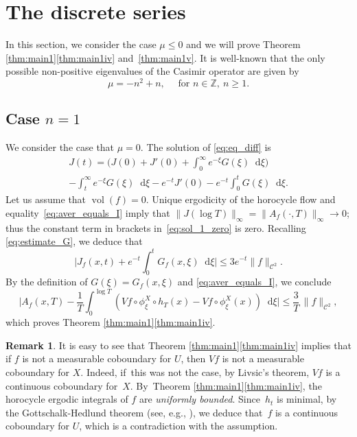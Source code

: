 \documentclass[11pt]{article}
\newcommand \Z{\mathbb{Z}}
\newcommand*{\diff}{\mathop{}\!\mathrm{d}}
\newcommand{\aver}[1]{A_{#1}(x,T)}
\DeclareMathOperator{\vol}{vol}
\theoremstyle{definition}
\newtheorem{remark}[theorem]{Remark}
\begin{document}
\section{The discrete series}\label{section:discrete_ser}

In this section, we consider the case $\mu \leq 0$ and we will prove Theorem \ref{thm:main1}\eqref{thm:main1iv} and~\eqref{thm:main1v}. It is well-known \cite{Bar} that the only possible non-positive eigenvalues of the Casimir operator are given by
\[
\mu = -n^2+n, \quad \text{ for }n \in \Z,\ n \geq 1.
\]

\subsection{Case $n=1$}
We consider the case that $\mu = 0$. The solution of \eqref{eq:eq_diff} is
\begin{multline}\label{eq:sol_1_zero}
J(t) = \biggl(J(0) + J'(0) + \int_0^\infty e^{-\xi}G(\xi) \diff \xi \biggr)\\
- \int_t^\infty e^{-\xi}G(\xi) \diff \xi - e^{-t} J'(0) - e^{-t}\int_0^t G(\xi) \diff \xi.
\end{multline}
Let us assume that $\vol(f)=0$. Unique ergodicity of the horocycle flow and equality~\eqref{eq:aver_equals_I} imply that $\|J(\log T) \|_\infty = \|A_f(\cdot, T) \|_\infty \to 0$; thus the constant term in brackets in~\eqref{eq:sol_1_zero} is zero.
Recalling \eqref{eq:estimate_G}, we deduce that
\[
\biggl\lvert J_f(x,t) + e^{-t}\int_0^t G_f(x,\xi) \diff \xi \biggr\rvert \leq 3 e^{-t} \|f\|_{\mathscr{C}^2}.
\]
By the definition of $G(\xi) = G_f(x,\xi)$ and \eqref{eq:aver_equals_I}, we conclude
\[
\biggl\lvert \aver{f} - \frac{1}{T} \int_0^{\log T} \left(Vf \circ \phi^X_\xi \circ h_T(x) - Vf\circ \phi^X_\xi (x) \right) \diff \xi \biggr\rvert \leq \frac{3}{T}\, \|f\|_{\mathscr{C}^2},
\]
which proves Theorem \ref{thm:main1}\eqref{thm:main1iv}.

\begin{remark}\label{remark:Vf_cob}
It is easy to see that Theorem \ref{thm:main1}\eqref{thm:main1iv} implies that if $f$ is not a measurable coboundary for $U$, then $Vf$ is not a measurable coboundary for $X$. Indeed, if~this was not the case, by Livsic's theorem, $Vf$ is a continuous coboundary for~$X$. By~Theorem \ref{thm:main1}\eqref{thm:main1iv}, the horocycle ergodic integrals of $f$ are \emph{uniformly bounded}. Since~$h_t$ is minimal, by the Gottschalk-Hedlund theorem (see, e.g., \cite[Th.\,C]{McC}), we deduce that~$f$ is a continuous coboundary for $U$, which is a contradiction with the assumption.
\end{remark}
\end{document}
